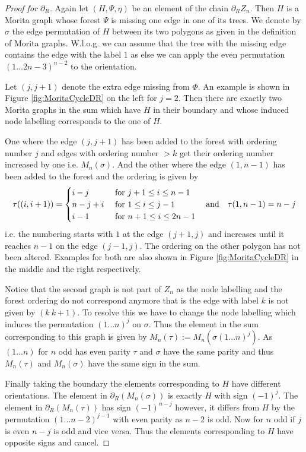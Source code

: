\begin{proof}[Proof for $\partial_{R}$]
	Again let $(H,\Psi,\eta)$ be an element of the chain $\partial_{R} Z_{n}$.
	Then $H$ is a Morita graph whose forest $\Psi$ is missing one edge in one of its trees.
	We denote by $\sigma$ the edge permutation of $H$ between its two polygons as given in the definition of Morita graphs.
	W.l.o.g. we can assume that the tree with the missing edge contains the 
	edge with the label $1$ as else we can apply the even permutation $(1 \ldots 2n-3)^{n-2}$ to the orientation.
	
	Let $(j,j+1)$ denote the extra edge missing from  $\Phi$. An example is shown in Figure \ref{fig:MoritaCycleDR} on the left for $j = 2$.
	Then there are exactly two Morita graphs in the sum which have $H$ in their boundary and whose induced node labelling corresponds to the one of $H$.

	One where the edge $(j,j+1)$ has been added to the forest with ordering number $j$ and edges with ordering number $> k$ get their ordering number increased by one
	i.e. $M_{n}(\sigma)$.
	And the other where the edge $(1,n-1)$ has been added to the forest and the ordering is given by
	\[
		\tau((i,i+1)) = \begin{cases}
			i-j & \text{ for } j+1 \leq i \leq n-1\\
			n-j+i & \text{ for } 1 \leq i \leq j-1\\
			i-1 & \text{ for } n+1 \leq i \leq 2n-1
		\end{cases} \qq{and} \tau(1,n-1) = n-j
	\] i.e. the numbering starts with $1$ at the edge $(j+1,j)$ and increases until it reaches $n-1$ on the edge  $(j-1,j)$. 
	The ordering on the other polygon has not been altered.
	Examples for both are also shown in Figure \ref{fig:MoritaCycleDR} in the middle and the right respectively.
	
	Notice that the second graph is not part of $Z_{n}$ as the node labelling and the forest ordering do not correspond anymore
	that is the edge with label $k$ is not given by  $(k\ k+1)$.
	To resolve this we have to change the node labelling which induces the permutation $(1 \ldots n)^{j}$ on $\sigma$.
	Thus the element in the sum corresponding to this graph is given by  $M_{n}(\tau) := M_{n}(\sigma (1 \ldots n)^{j})$.
	As $(1 \ldots n)$ for $n$ odd has even parity $\tau$ and $\sigma$ have the same parity and thus $M_{n}(\tau)$ and $M_{n}(\sigma)$ have the same sign
	in the sum. 
	
	Finally taking the boundary the elements corresponding to $H$ have different orientations.
	The element in $\partial_{R}(M_{n}(\sigma))$ is exactly $H$ with sign $(-1)^{j}$. The element in $\partial_{R}(M_{n}(\tau))$ has sign $(-1)^{n-j}$ however, it 
	differs from $H$ by the permutation $(1 \ldots n-2)^{j - 1}$ with even parity as $n-2$ is odd.
	Now for $n$ odd if $j$ is even $n-j$ is odd and vice versa. Thus the elements corresponding to $H$ have opposite signs and cancel.


\end{proof}
